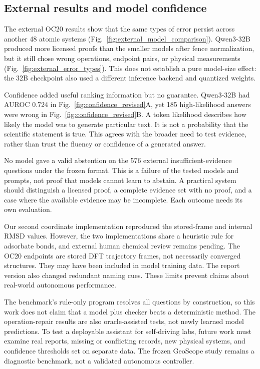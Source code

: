 \subsection{External results and model confidence}
\label{sec:external_discussion}

The external OC20 results show that the same types of error persist across another 48 atomic systems (Fig.~\ref{fig:external_model_comparison}). Qwen3-32B produced more licensed proofs than the smaller models after fence normalization, but it still chose wrong operations, endpoint pairs, or physical measurements (Fig.~\ref{fig:external_error_types}). This does not establish a pure model-size effect: the 32B checkpoint also used a different inference backend and quantized weights.

Confidence added useful ranking information but no guarantee. Qwen3-32B had AUROC 0.724 in Fig.~\ref{fig:confidence_revised}A, yet 185 high-likelihood answers were wrong in Fig.~\ref{fig:confidence_revised}B. A token likelihood describes how likely the model was to generate particular text. It is not a probability that the scientific statement is true. This agrees with the broader need to test evidence, rather than trust the fluency or confidence of a generated answer.\cite{yu2026scicueval,chen2026phyver,zheng2026sciverifier}

No model gave a valid abstention on the 576 external insufficient-evidence questions under the frozen format. This is a failure of the tested models and prompts, not proof that models cannot learn to abstain. A practical system should distinguish a licensed proof, a complete evidence set with no proof, and a case where the available evidence may be incomplete. Each outcome needs its own evaluation.

Our second coordinate implementation reproduced the stored-frame and internal RMSD values. However, the two implementations share a heuristic rule for adsorbate bonds, and external human chemical review remains pending. The OC20 endpoints are stored DFT trajectory frames, not necessarily converged structures. They may have been included in model training data. The report version also changed redundant naming cues. These limits prevent claims about real-world autonomous performance.

The benchmark's rule-only program resolves all questions by construction, so this work does not claim that a model plus checker beats a deterministic method. The operation-repair results are also oracle-assisted tests, not newly learned model predictions. To test a deployable assistant for self-driving labs, future work must examine real reports, missing or conflicting records, new physical systems, and confidence thresholds set on separate data. The frozen GeoScope study remains a diagnostic benchmark, not a validated autonomous controller.


